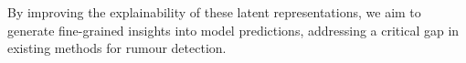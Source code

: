 By improving the explainability of these latent representations, we aim to generate fine-grained insights into model predictions, addressing a critical gap in existing methods for rumour detection.




